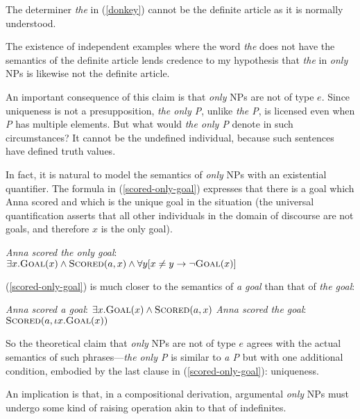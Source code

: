 The determiner \textit{the} in (\ref{donkey}) cannot be the definite article as it is normally understood.

The existence of independent examples where the word \textit{the} does not have the semantics of the definite article lends credence to my hypothesis that \textit{the} in \textit{only} NPs is likewise not the definite article.

An important consequence of this claim is that \textit{only} NPs are not of type $e$. Since uniqueness is not a presupposition, \textit{the only P}, unlike \textit{the P}, is licensed even when \textit{P} has multiple elements. But what would \textit{the only P} denote in such circumstances? It cannot be the undefined individual, because such sentences have defined truth values.

In fact, it is natural to model the semantics of \textit{only} NPs with an existential quantifier. The formula in (\ref{scored-only-goal}) expresses that there is a goal which Anna scored and which is the unique goal in the situation (the universal quantification asserts that all other individuals in the domain of discourse are not goals, and therefore $x$ is the only goal).

\begin{exe}
	\ex \label{scored-only-goal} \textit{Anna scored the only goal}: \\ $\exists x . \textsc{Goal}(x) \land \textsc{Scored}(a, x) \land \forall y [ x \ne y \to \neg \textsc{Goal}(x) ] $
\end{exe}

(\ref{scored-only-goal}) is much closer to the semantics of \textit{a goal} than that of \textit{the goal}:

\begin{exe}
	\ex \label{a-goal} \textit{Anna scored a goal}: $\exists x . \textsc{Goal}(x) \land \textsc{Scored}(a, x)$
	\ex \label{the-goal} \textit{Anna scored the goal}: $\textsc{Scored}(a, \iota x . \textsc{Goal}(x))$
\end{exe}

So the theoretical claim that \textit{only} NPs are not of type $e$ agrees with the actual semantics of such phrases---\textit{the only P} is similar to \textit{a P} but with one additional condition, embodied by the last clause in (\ref{scored-only-goal}): uniqueness.

An implication is that, in a compositional derivation, argumental \textit{only} NPs must undergo some kind of raising operation akin to that of indefinites.

